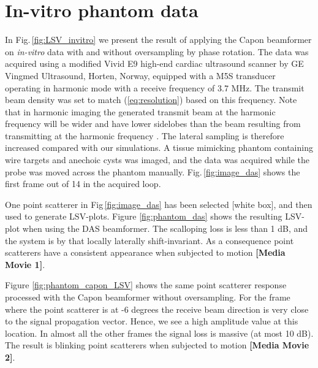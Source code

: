 \documentclass[draftcls]{IEEEtran}
\newcommand\multimedia[1]{\textbf{{\color{red}[#1]}}}
\begin{document}
\section{In-vitro phantom data}\label{sec:res}
In Fig.\,\ref{fig:LSV_invitro} we present the result of applying the Capon beamformer on \textit{in-vitro} data with and without oversampling by phase rotation. The data was acquired using a modified Vivid E9 high-end cardiac ultrasound scanner by GE Vingmed Ultrasound, Horten, Norway, equipped with a M5S transducer operating in harmonic mode with a receive frequency of 3.7 MHz. The transmit beam density was set to match (\ref{eq:resolution}) based on this frequency. Note that in harmonic imaging the generated transmit beam at the harmonic frequency will be wider and have lower sidelobes than the beam resulting from transmitting at the harmonic frequency \cite{Fedewa2004}. The lateral sampling is therefore increased compared with our simulations. A tissue mimicking phantom containing wire targets and anechoic cysts was imaged, and the data was acquired while the probe was moved across the phantom manually. Fig.\,\ref{fig:image_das} shows the first frame out of 14 in the acquired loop. %

One point scatterer in Fig\,\ref{fig:image_das} has been selected [white box], and then used to generate LSV-plots. Figure \ref{fig:phantom_das} shows the resulting LSV-plot when using the DAS beamformer. The scalloping loss is less than 1 dB, and the system is by that locally laterally shift-invariant. As a consequence point scatterers have a consistent appearance when subjected to motion \multimedia{Media Movie 1}.  

Figure \ref{fig:phantom_capon_LSV} shows the same point scatterer response processed with the Capon beamformer without oversampling. For the frame where the point scatterer is at -6 degrees the receive beam direction is very close to the signal propagation vector. Hence, we see a high amplitude value at this location. In almost all the other frames the signal loss is massive (at most 10 dB). The result is blinking point scatterers when subjected to motion \multimedia{Media Movie 2}. 
\end{document}
